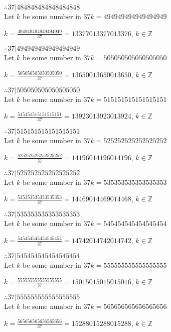 \documentclass{article}
\begin{document}
$ \therefore  37|484848484848484848 $ \\

Let $k$ be some number in $37k = 494949494949494949$

$k = \frac{494949494949494949}{37} = 13377013377013376$, $k \in \mathbb{Z}$

$ \therefore  37|494949494949494949 $ \\

Let $k$ be some number in $37k = 505050505050505050$

$k = \frac{505050505050505050}{37} = 13650013650013650$, $k \in \mathbb{Z}$

$ \therefore  37|505050505050505050 $ \\

Let $k$ be some number in $37k = 515151515151515151$

$k = \frac{515151515151515151}{37} = 13923013923013924$, $k \in \mathbb{Z}$

$ \therefore  37|515151515151515151 $ \\

Let $k$ be some number in $37k = 525252525252525252$

$k = \frac{525252525252525252}{37} = 14196014196014196$, $k \in \mathbb{Z}$

$ \therefore  37|525252525252525252 $ \\

Let $k$ be some number in $37k = 535353535353535353$

$k = \frac{535353535353535353}{37} = 14469014469014468$, $k \in \mathbb{Z}$

$ \therefore  37|535353535353535353 $ \\

Let $k$ be some number in $37k = 545454545454545454$

$k = \frac{545454545454545454}{37} = 14742014742014742$, $k \in \mathbb{Z}$

$ \therefore  37|545454545454545454 $ \\

Let $k$ be some number in $37k = 555555555555555555$

$k = \frac{555555555555555555}{37} = 15015015015015016$, $k \in \mathbb{Z}$

$ \therefore  37|555555555555555555 $ \\

Let $k$ be some number in $37k = 565656565656565656$

$k = \frac{565656565656565656}{37} = 15288015288015288$, $k \in \mathbb{Z}$
\end{document}
